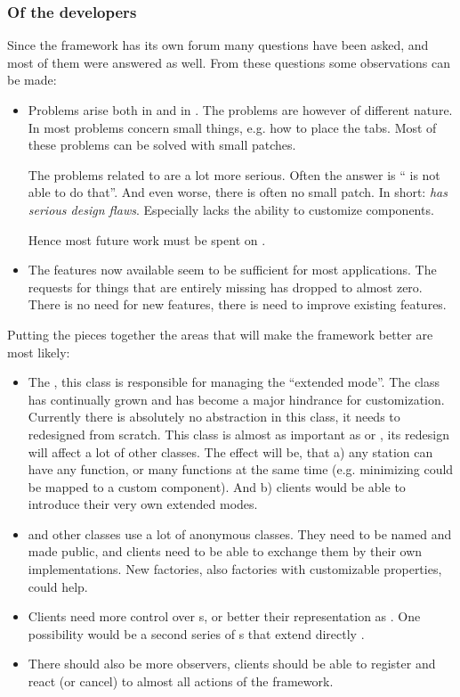 \subsubsection{Of the developers}
Since the framework has its own forum many questions have been asked, and most of them were answered as well. From these questions some observations can be made:

\begin{itemize}
 \item Problems arise both in  and in . The problems are however of different nature. In  most problems concern small things, e.g. how to place the tabs. Most of these problems can be solved with small patches. 
 
 The problems related to  are a lot more serious. Often the answer is `` is not able to do that''. And even worse, there is often no small patch. In short: \textit{ has serious design flaws}. Especially  lacks the ability to customize components.
 
 Hence most future work must be spent on .
 
 \item The features now available seem to be sufficient for most applications. The requests for things that are entirely missing has dropped to almost zero. There is no need for new features, there is need to improve existing features.
\end{itemize}

Putting the pieces together the areas that will make the framework better are most likely:
\begin{itemize}
 \item The , this class is responsible for managing the ``extended mode''. The class has continually grown and has become a major hindrance for customization. Currently there is absolutely no abstraction in this class, it needs to redesigned from scratch. This class is almost as important as  or , its redesign will affect a lot of other classes. The effect will be, that a) any station can have any function, or many functions at the same time (e.g. minimizing could be mapped to a custom component). And b) clients would be able to introduce their very own extended modes.
 \item {} and other classes use a lot of anonymous classes. They need to be named and made public, and clients need to be able to exchange them by their own implementations. New factories, also factories with customizable properties, could help.
 \item Clients need more control over s, or better their representation as . One possibility would be a second series of s that extend directly .
 \item There should also be more observers, clients should be able to register and react (or cancel) to almost all actions of the framework.
\end{itemize}
 
